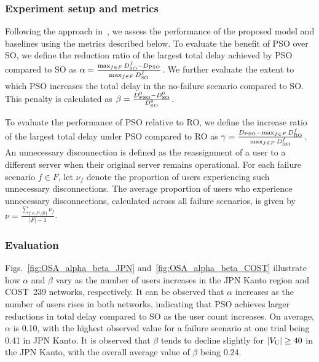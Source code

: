 \documentclass[conference]{IEEEtran}
\begin{document}
\begin{CJK}{UTF8}{ipxm}
\subsubsection{Experiment setup and metrics}
Following the approach in~\cite{5_9_13_Kamrul2010, 5_9_Masuda2020}, we assess the performance of the proposed model and baselines using the metrics described below.
To evaluate the benefit of PSO over SO, we define the reduction ratio of the largest total delay achieved by PSO compared to SO as
$\alpha = \frac{\max_{f \in F}D^f_{\rm SO} - D_{\rm PSO}}{\max_{f \in F}D^f_{\rm SO}}$.
We further evaluate the extent to which PSO increases the total delay in the no-failure scenario compared to SO. This penalty is calculated as
$\beta = \frac{D^0_{\rm PSO} - D^0_{\rm SO}}{D^0_{\rm SO}}$.

To evaluate the performance of PSO relative to RO, we define the increase ratio of the largest total delay under PSO compared to RO as
$\gamma = \frac{D_{\rm PSO} - \max_{f \in F}D^f_{\rm RO}}{\max_{f \in F}D^f_{\rm RO}}$.
An unnecessary disconnection is defined as the reassignment of a user to a different server when their original server remains operational.
For each failure scenario $f \in F$, let $\nu_f$ denote the proportion of users experiencing such unnecessary disconnections.
The average proportion of users who experience unnecessary disconnections, calculated across all failure scenarios, is given by
$\nu = \frac{\sum_{f \in F \setminus \{0\}}\nu_f}{|F| - 1}$.

\subsubsection{Evaluation}
Figs.~\ref{fig:OSA_alpha_beta_JPN} and~\ref{fig:OSA_alpha_beta_COST} illustrate how $\alpha$ and $\beta$ vary as the number of users increases in the JPN Kanto region and COST~239 networks, respectively.
It can be observed that $\alpha$ increases as the number of users rises in both networks, indicating that PSO achieves larger reductions in total delay compared to SO as the user count increases.
On average, $\alpha$ is 0.10, with the highest observed value for a failure scenario at one trial being 0.41 in JPN Kanto.
It is observed that $\beta$ tends to decline slightly for $|V_{\rm U}| \geq 40$ in the JPN Kanto, with the overall average value of $\beta$ being 0.24.


\end{CJK}
\end{document}
